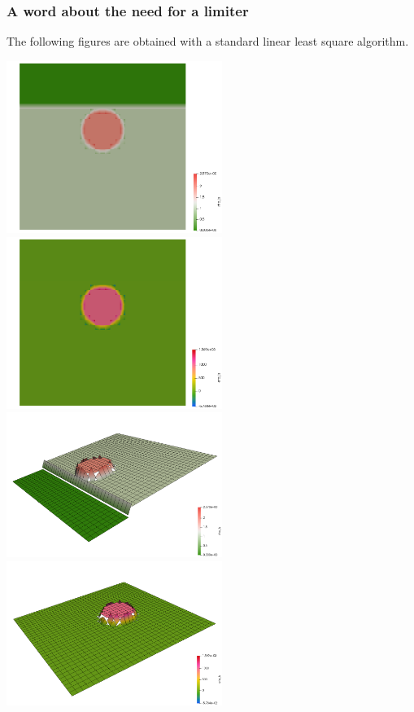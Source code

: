 \subsubsection*{A word about the need for a limiter}

The following figures are obtained with a standard linear least square algorithm. 

\begin{center}
\includegraphics[width=7cm]{python_codes/fieldstone_41/results/exp3/rho_ls}
\includegraphics[width=7cm]{python_codes/fieldstone_41/results/exp3/eta_ls}\\
\includegraphics[width=7cm]{python_codes/fieldstone_41/results/exp3/rho_ls_warp}
\includegraphics[width=7cm]{python_codes/fieldstone_41/results/exp3/eta_ls_warp}\\

\end{center}
